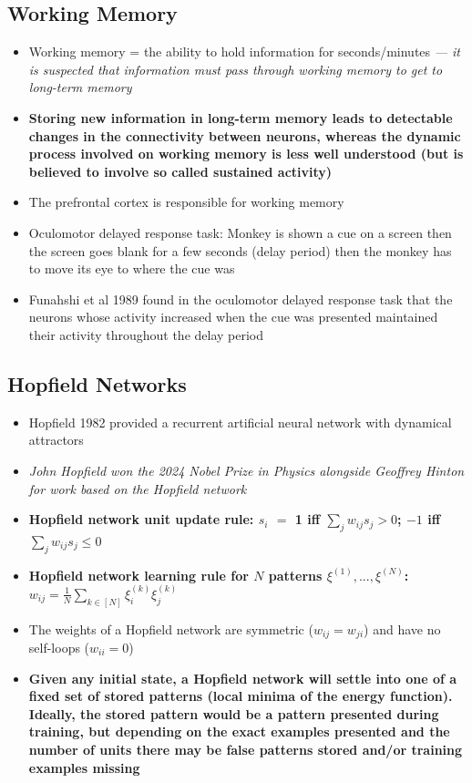\documentclass[20pt,a4paper,landscape]{extarticle}
\begin{document}
\begin{flushleft}
\subsection{Working Memory}
\begin{itemize}
\item Working memory = the ability to hold information for seconds/minutes \textit{--- it is suspected that information must pass through working memory to get to long-term memory}
\item \textbf{Storing new information in long-term memory leads to detectable changes in the connectivity between neurons, whereas the dynamic process involved on working memory is less well understood (but is believed to involve so called sustained activity)}
\item The prefrontal cortex is responsible for working memory
\item Oculomotor delayed response task: Monkey is shown a cue on a screen then the screen goes blank for a few seconds (delay period) then the monkey has to move its eye to where the cue was
\item Funahshi et al 1989 found in the oculomotor delayed response task that the neurons whose activity increased when the cue was presented maintained their activity throughout the delay period
\end{itemize}
\clearpage
\subsection{Hopfield Networks}
\begin{itemize}
\item Hopfield 1982 provided a recurrent artificial neural network with dynamical attractors
\item \textit{John Hopﬁeld won the 2024 Nobel Prize in Physics alongside Geoffrey Hinton for work based on the Hopﬁeld network}
\item \textbf{Hopfield network unit update rule: \boldmath$s_i$ $=$ 1 iff $\sum_j w_{ij}s_j > 0$; $-1$ iff $\sum_j w_{ij}s_j \leq 0$}
\item \textbf{Hopfield network learning rule for \boldmath$N$ patterns $\xi^{(1)}, ..., \xi^{(N)}$: $w_{ij} = \frac{1}{N}\sum_{k \in [N]} \xi^{(k)}_i\xi^{(k)}_j$}
\item The weights of a Hopfield network are symmetric ($w_{ij}=w_{ji}$) and have no self-loops ($w_{ii} = 0$)
\clearpage
\item \textbf{Given any initial state, a Hopfield network will settle into one of a fixed set of stored patterns (local minima of the energy function). Ideally, the stored pattern would be a pattern presented during training, but depending on the exact examples presented and the number of units there may be false patterns stored and/or training examples missing}
\end{itemize}

\end{flushleft}
\end{document}
